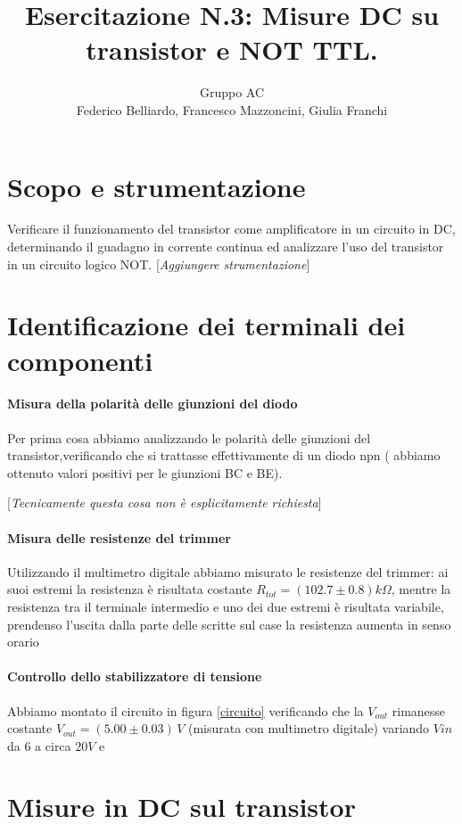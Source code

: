\documentclass[10pt,a4paper]{article}
\author{Gruppo AC \\ Federico Belliardo, Francesco Mazzoncini, Giulia Franchi}
\title{Esercitazione N.3: Misure DC su transistor e NOT TTL.}
\newcommand{\rem}[1]{[\emph{#1}]}
\begin{document}
\maketitle
\section{Scopo e strumentazione}
Verificare il funzionamento del transistor come amplificatore in un circuito in DC, determinando il guadagno in corrente continua ed analizzare l'uso del transistor in un circuito logico NOT.
\rem{Aggiungere strumentazione}

\section{Identificazione dei terminali dei componenti}

\paragraph{Misura della polarità delle giunzioni del diodo}
Per prima cosa abbiamo analizzando le polarità delle giunzioni del transistor,verificando che si trattasse effettivamente  di un diodo npn ( abbiamo ottenuto valori positivi per le giunzioni BC e BE).

\rem{Tecnicamente questa cosa non è esplicitamente richiesta}
\paragraph{Misura delle resistenze del trimmer}
Utilizzando il multimetro digitale abbiamo misurato le resistenze del trimmer: ai suoi estremi la resistenza è risultata costante $R_{tot}= (102.7 \pm 0.8) k\Omega$, mentre la resistenza tra il terminale intermedio e uno dei due estremi è risultata variabile, prendenso l'uscita dalla parte delle scritte sul case la resistenza aumenta in senso orario
\paragraph{Controllo dello stabilizzatore di tensione}
Abbiamo montato il circuito in  figura \ref{circuito} verificando che  la $V_{out}$ rimanesse costante $V_{out} = (5.00 \pm 0.03) \, V$ (misurata con multimetro digitale) variando $V{in}$ da 6 a circa  $20V$ e 

\section{Misure in DC sul transistor}
\end{document}
